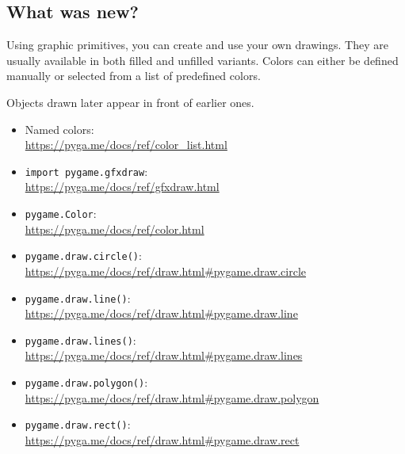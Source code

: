 \newpage
\subsection{What was new?}
\begin{hintbox}
	Using graphic primitives, you can create and use your own drawings. They are usually available in both filled and unfilled variants. Colors can either be defined manually or selected from a list of predefined colors.
	
	Objects drawn later appear in front of earlier ones.
\end{hintbox}

\begin{pygbox}
\begin{itemize}
	\item Named colors:\\ 
	\url{https://pyga.me/docs/ref/color_list.html}
	
	\item \texttt{import pygame.gfxdraw}:\\ \url{https://pyga.me/docs/ref/gfxdraw.html}
	
	\item \texttt{pygame.Color}:
	\\
	\url{https://pyga.me/docs/ref/color.html}
	
	\item \texttt{pygame.draw.circle()}:
	\\
	\url{https://pyga.me/docs/ref/draw.html#pygame.draw.circle}
	
	\item \texttt{pygame.draw.line()}:
	\\
	\url{https://pyga.me/docs/ref/draw.html#pygame.draw.line}
	
	\item \texttt{pygame.draw.lines()}:
	\\
	\url{https://pyga.me/docs/ref/draw.html#pygame.draw.lines}
	
	\item \texttt{pygame.draw.polygon()}:
	\\
	\url{https://pyga.me/docs/ref/draw.html#pygame.draw.polygon}
	
	\item \texttt{pygame.draw.rect()}:
	\\
	\url{https://pyga.me/docs/ref/draw.html#pygame.draw.rect}
	

\end{itemize}
\end{pygbox}
